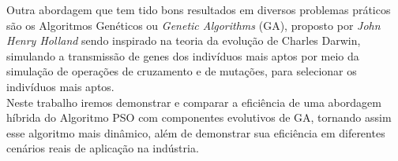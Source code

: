 Outra abordagem que tem tido bons resultados em diversos problemas práticos \cite{Qing2012} são os Algoritmos Genéticos ou \textit{Genetic Algorithms} (GA), proposto por \textit{John Henry Holland} sendo inspirado na teoria da evolução de Charles Darwin, simulando a transmissão de genes dos indivíduos mais aptos por meio da simulação de operações de cruzamento e de mutações, para selecionar os indivíduos mais aptos.\\
Neste trabalho iremos demonstrar e comparar a eficiência de uma abordagem híbrida do Algoritmo PSO com componentes evolutivos de GA, tornando assim esse algoritmo mais dinâmico, além de demonstrar sua eficiência em diferentes cenários reais de aplicação na indústria.

